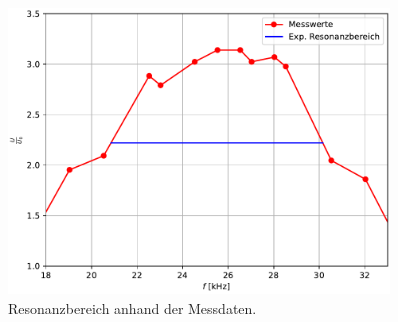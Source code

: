 \begin{figure}[H]
  \centering
  \includegraphics[width=0.90\textwidth]{plot_c.pdf}
  \caption{Resonanzbereich anhand der Messdaten.}
  \label{fig:Resonanzbereich}
\end{figure}

